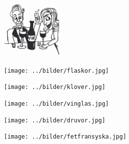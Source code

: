 $  $%
%

\begin{intersong}
\sffamily\bfseries\LARGE{}
\begin{center}
\includegraphics[width=3cm]{../bilder/fardigabilder/BilderTillKapitel/vinvisor.png} 
\end{center}
\end{intersong}
\sclearpage

\sclearpage

\sclearpage

\begin{intersong}
\begin{center}
\texttt{[image: ../bilder/flaskor.jpg]} 
\end{center}
\end{intersong}
\sclearpage

%
\begin{intersong}
\begin{center}
\texttt{[image: ../bilder/klover.jpg]} 
\end{center}
\end{intersong}
\sclearpage

\begin{intersong}
\begin{center}
\texttt{[image: ../bilder/vinglas.jpg]} 
\end{center}
\end{intersong}
\sclearpage

\sclearpage

\sclearpage

\sclearpage

\begin{intersong}
\begin{center}
\texttt{[image: ../bilder/druvor.jpg]} 
\end{center}
\end{intersong}
\sclearpage

\begin{intersong}
\begin{center}
\texttt{[image: ../bilder/fetfransyska.jpg]} 
\end{center}
\end{intersong}
\sclearpage
%

